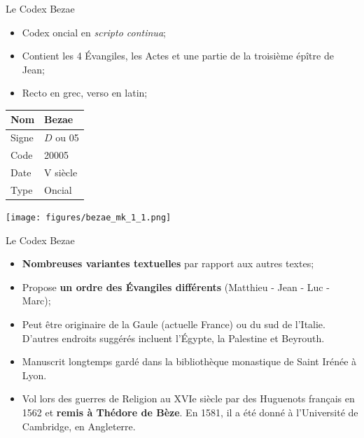\documentclass[11pt]{beamer}
\begin{document}
\begin{frame}{Le Codex Bezae}
    \begin{block}{}
        \begin{itemize}
            \item Codex oncial en \textit{scripto continua};
            \item Contient les 4 Évangiles, les Actes et une partie de la troisième épître de Jean;
            \item Recto en grec, verso en latin;
        \end{itemize}
    \end{block}
        \vfill
    \begin{minipage}{.4\textwidth}
\begin{tabular}{l|l}
     Nom & Bezae \\
     \hline
     Signe & $D$ ou 05 \\
     \hline
     Code & 20005\\
     \hline
     Date & V\ieme{} siècle \\
     \hline
     Type & Oncial \\
\end{tabular}
\end{minipage}
\hfill
\begin{minipage}{.45\textwidth}
    \texttt{[image: figures/bezae\_mk\_1\_1.png]}
\end{minipage}
\end{frame}

\begin{frame}{Le Codex Bezae}
    \begin{itemize}
        \item \textbf{Nombreuses variantes textuelles} par rapport aux autres textes;
        \item Propose \textbf{un ordre des Évangiles différents} (Matthieu - Jean - Luc - Marc);
        \item Peut être originaire de la Gaule (actuelle France) ou du sud de l'Italie. D'autres endroits suggérés incluent l'Égypte, la Palestine et Beyrouth.

        \item Manuscrit longtemps gardé dans la bibliothèque monastique de Saint Irénée à Lyon.
        \item Vol lors des guerres de Religion au XVIe siècle par des Huguenots français en 1562 et \textbf{remis à Thédore de Bèze}. En 1581, il a été donné à l'Université de Cambridge, en Angleterre.
    \end{itemize}
\end{frame}
\end{document}
